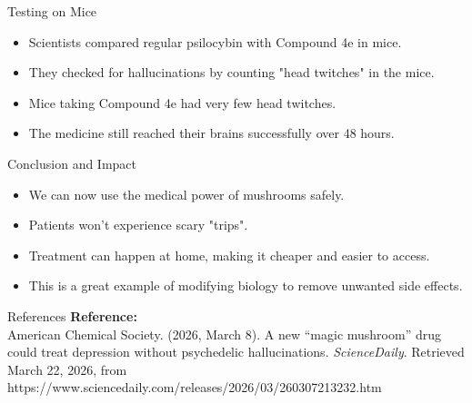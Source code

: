 \documentclass{beamer}
\begin{document}
\begin{frame}{Testing on Mice}
\begin{itemize}
    \item Scientists compared regular psilocybin with Compound 4e in mice.
    \item They checked for hallucinations by counting "head twitches" in the mice.
    \item Mice taking Compound 4e had very few head twitches.
    \item The medicine still reached their brains successfully over 48 hours.
\end{itemize}
\vspace{0.3cm}
\end{frame}

\begin{frame}{Conclusion and Impact}
\begin{itemize}
    \item We can now use the medical power of mushrooms safely.
    \item Patients won't experience scary "trips".
    \item Treatment can happen at home, making it cheaper and easier to access.
    \item This is a great example of modifying biology to remove unwanted side effects.
\end{itemize}
\end{frame}

\begin{frame}{References}
\textbf{Reference:} \\
\vspace{0.5cm}
American Chemical Society. (2026, March 8). A new ``magic mushroom'' drug could treat depression without psychedelic hallucinations. \textit{ScienceDaily}. Retrieved March 22, 2026, from https://www.sciencedaily.com/releases/2026/03/260307213232.htm
\end{frame}
\end{document}
